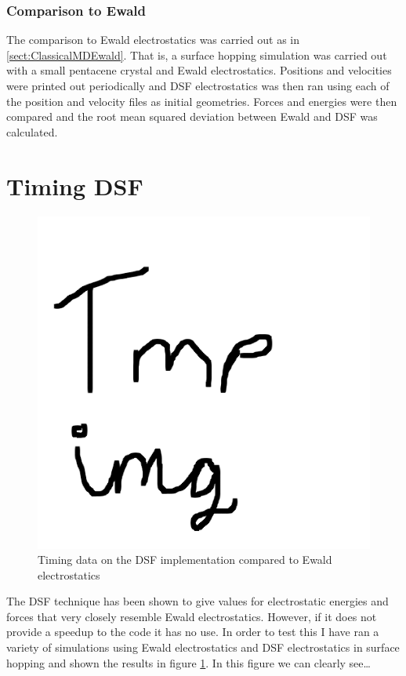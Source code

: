 \subsubsection{Comparison to Ewald}
The comparison to Ewald electrostatics was carried out as in \ref{sect:ClassicalMDEwald}. That is, a surface hopping simulation was carried out with a small pentacene crystal and Ewald electrostatics. Positions and velocities were printed out periodically and DSF electrostatics was then ran using each of the position and velocity files as initial geometries. Forces and energies were then compared and the root mean squared deviation between Ewald and DSF was calculated.

\section{Timing DSF}
\begin{figure}[htp]
  \includegraphics[width=\textwidth]{./img/tmp.png}
  \caption{\label{fig:DSF_Timings}Timing data on the DSF implementation compared to Ewald electrostatics}
\end{figure}
The DSF technique has been shown to give values for electrostatic energies and forces that very closely resemble Ewald electrostatics. However, if it does not provide a speedup to the code it has no use. In order to test this I have ran a variety of simulations using Ewald electrostatics and DSF electrostatics in surface hopping and shown the results in figure \ref{fig:DSF_Timings}. In this figure we can clearly see\ldots


